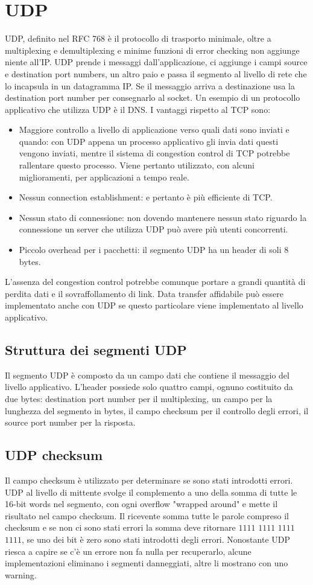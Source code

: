 \section{UDP}
UDP, definito nel RFC 768 \`e il protocollo di trasporto minimale, oltre a multiplexing e demultiplexing e minime funzioni di error checking non aggiunge 
niente all'IP. UDP prende i messaggi dall'applicazione, ci aggiunge i campi source e destination port numbers, un altro paio e passa il segmento 
al livello di rete che lo incapsula in un datagramma IP. Se il messaggio arriva a destinazione usa la destination port number per consegnarlo al socket. 
Un esempio di un protocollo applicativo che utilizza UDP \`e il DNS. I vantaggi rispetto al TCP sono:
\begin{itemize}
\item Maggiore controllo a livello di applicazione verso quali dati sono inviati e quando: con UDP appena un processo applicativo gli invia dati questi
vengono inviati, mentre il sistema di congestion control di TCP potrebbe rallentare questo processo. Viene pertanto utilizzato, con alcuni miglioramenti, 
per applicazioni a tempo reale.
\item Nessun connection establishment: e pertanto \`e pi\`u efficiente di TCP.
\item Nessun stato di connessione: non dovendo mantenere nessun stato riguardo la connessione un server che utilizza UDP pu\`o avere pi\`u utenti 
concorrenti.
\item Piccolo overhead per i pacchetti: il segmento UDP ha un header di soli 8 bytes. 
\end{itemize}
L'assenza del congestion control potrebbe comunque portare a grandi quantit\`a di perdita dati e il sovraffollamento di link. Data transfer affidabile pu\`o essere 
implementato anche con UDP se questo particolare viene implementato al livello applicativo. 
\subsection{Struttura dei segmenti UDP}
Il segmento UDP \`e composto da un campo dati che contiene il messaggio del livello applicativo. L'header possiede solo quattro campi, ognuno costituito da
due bytes: destination port number per il multiplexing, un campo per la lunghezza del segmento in bytes, il campo checksum per il controllo degli errori, il
source port number per la risposta.
\subsection{UDP checksum}
Il campo checksum \`e utilizzato per determinare se sono stati introdotti errori. UDP al livello di mittente svolge il complemento a uno della somma di 
tutte le 16-bit words nel segmento, con ogni overflow "wrapped around" e mette il risultato nel campo checksum. Il ricevente somma tutte le parole compreso 
il checksum e se non ci sono stati errori la somma deve ritornare $1111$ $1111$ $1111$ $1111$, se uno dei bit \`e zero sono stati introdotti degli errori. 
Nonostante UDP riesca a capire se c'\`e un errore non fa nulla per recuperarlo, alcune implementazioni eliminano i segmenti danneggiati, altre li mostrano
con uno warning. 
